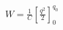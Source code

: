\documentclass[preview]{standalone}
\begin{document}
\begin{align*}
W  = \frac{1}{C}  \left[ \frac{q^2}{2} \right]_{0}^{q_0}
\end{align*}
\end{document}
